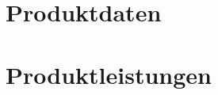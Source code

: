 \documentclass[pflichtenheft.tex]{subfiles}
\begin{document}
\chapter{Produktdaten}

\chapter{Produktleistungen}
\end{document}
